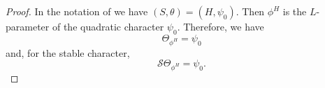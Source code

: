\documentclass[11pt]{amsart}
\numberwithin{equation}{section}
\def\fe{\mathfrak{e}}
\def\rU{\mathrm{U}}
\newcommand{\<}{\left\langle}
\renewcommand{\>}{\right\rangle}
\begin{document}
\begin{proof}
  
  
  
In the notation of \cite[\S4,4]{FKS} we have $(S, \theta) = (H, \psi_0)$.    Then $\phi^H$ is the  $L$-parameter of the quadratic character $\psi_0$.   Therefore, we  have
\[
\Theta_{\phi^H} = \psi_0
\]
and, for the stable character,
\begin{equation}\label{STheta}
\mathscr{S}\Theta_{\phi^H} = \psi_0.
\end{equation}
\end{proof}
 
 
\end{document}
